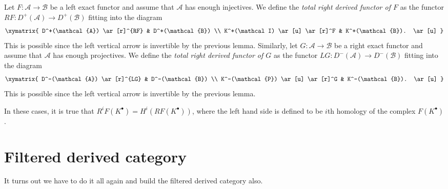 \begin{definition}
\label{definition-derived-functor}
Let $F: \mathcal{A} \to \mathcal{B}$ be a left exact functor and assume that
$\mathcal{A}$ has enough injectives. We define the {\it total right derived
functor of $F$} as the functor $RF: D^+(\mathcal{A}) \to D^+(\mathcal{B})$
fitting into the diagram
$$
\xymatrix{
D^+(\mathcal{A}) \ar[r]^{RF} & D^+(\mathcal{B}) \\
K^+(\mathcal I) \ar[u] \ar[r]^F & K^+(\mathcal{B}). \ar[u]
}
$$
This is possible since the left vertical arrow is invertible by the previous
lemma. Similarly, let $G: \mathcal{A} \to \mathcal{B}$ be a right exact
functor and assume that $\mathcal{A}$ has enough projectives. We define the
{\it total right derived functor of $G$} as the functor $LG: D^-(\mathcal{A})
\to D^-(\mathcal{B})$ fitting into the diagram
$$
\xymatrix{
D^-(\mathcal{A}) \ar[r]^{LG} & D^-(\mathcal{B}) \\
K^-(\mathcal{P}) \ar[u] \ar[r]^G & K^-(\mathcal{B}). \ar[u]
}
$$
This is possible since the left vertical arrow is invertible by the previous
lemma.
\end{definition}

\begin{remark}
\label{remark-cohomology-of-derived-functor}
In these cases, it is true that $R^iF(K^\bullet) = H^i(RF(K^\bullet))$, where
the left hand side is defined to be $i$th homology of the complex
$F(K^\bullet)$.
\end{remark}




\section{Filtered derived category}
\label{section-filtered-derived-category}

\noindent
It turns out we have to do it all again and build the filtered derived
category also.

